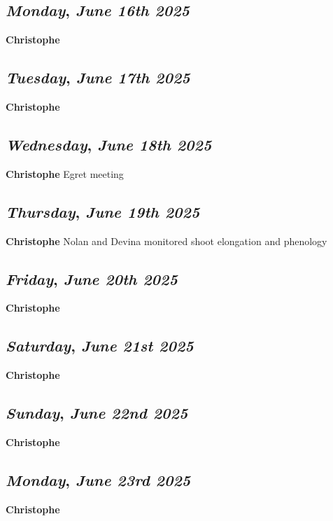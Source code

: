 \def\day{\textit{June 16th 2025}}
\def\weekday{\textit{Monday}}
\subsection*{\weekday, \day}
\textbf {Christophe}


\def\day{\textit{June 17th 2025}}
\def\weekday{\textit{Tuesday}}
\subsection*{\weekday, \day}
\textbf {Christophe}

\def\day{\textit{June 18th 2025}}
\def\weekday{\textit{Wednesday}}
\subsection*{\weekday, \day}
\textbf {Christophe}
Egret meeting

\def\day{\textit{June 19th 2025}}
\def\weekday{\textit{Thursday}}
\subsection*{\weekday, \day}
\textbf {Christophe}
Nolan and Devina monitored shoot elongation and phenology
\def\day{\textit{June 20th 2025}}
\def\weekday{\textit{Friday}}
\subsection*{\weekday, \day}
\textbf {Christophe}

\def\day{\textit{June 21st 2025}}
\def\weekday{\textit{Saturday}}
\subsection*{\weekday, \day}
\textbf {Christophe}

\def\day{\textit{June 22nd 2025}}
\def\weekday{\textit{Sunday}}
\subsection*{\weekday, \day}
\textbf {Christophe}

\def\day{\textit{June 23rd 2025}}
\def\weekday{\textit{Monday}}
\subsection*{\weekday, \day}
\textbf {Christophe}

\def\day{\textit{June 24th 2025}}
\def\weekday{\textit{Tuesday}}
